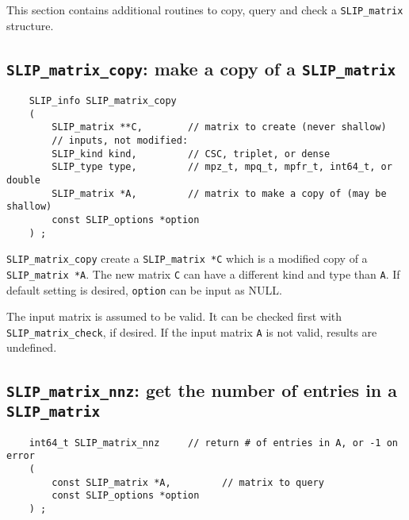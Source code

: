 \documentclass[12pt]{article}
\theoremstyle{definition}
\begin{document}
This section contains additional routines to copy, query and check a
\verb|SLIP_matrix| structure.


\cprotect\subsection{\verb|SLIP_matrix_copy|: make a copy of a \verb|SLIP_matrix|}

\begin{mdframed}[userdefinedwidth=6in]
{\footnotesize
\begin{verbatim}
    SLIP_info SLIP_matrix_copy
    (
        SLIP_matrix **C,        // matrix to create (never shallow)
        // inputs, not modified:
        SLIP_kind kind,         // CSC, triplet, or dense
        SLIP_type type,         // mpz_t, mpq_t, mpfr_t, int64_t, or double
        SLIP_matrix *A,         // matrix to make a copy of (may be shallow)
        const SLIP_options *option
    ) ;
\end{verbatim}
} \end{mdframed}

\verb|SLIP_matrix_copy| create a \verb|SLIP_matrix *C| which is a modified copy
of a \verb|SLIP_matrix *A|. The new matrix \verb|C| can have a different
kind and type than \verb|A|.
If default setting is desired, \verb|option| can be input as NULL.

The input matrix is assumed to be valid. It can be checked first with
\verb|SLIP_matrix_check|, if desired. If the input matrix \verb|A| is not valid,
results are undefined.


\cprotect\subsection{\verb|SLIP_matrix_nnz|: get the number of entries in a
\verb|SLIP_matrix|}

\begin{mdframed}[userdefinedwidth=6in]
{\footnotesize
\begin{verbatim}
    int64_t SLIP_matrix_nnz     // return # of entries in A, or -1 on error
    (
        const SLIP_matrix *A,         // matrix to query
        const SLIP_options *option
    ) ;
\end{verbatim}
} \end{mdframed}
\end{document}

